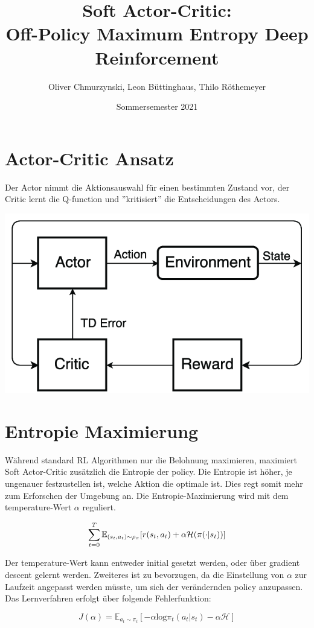 \documentclass[8pt]{article}
\title{\vspace{-3cm}Soft Actor-Critic:\\
{\Large Off-Policy Maximum Entropy Deep Reinforcement}}
\author{{\normalsize Oliver Chmurzynski, Leon Büttinghaus, Thilo Röthemeyer}}
\date{{\normalsize Sommersemester 2021}}
\begin{document}
\maketitle
\thispagestyle{empty}

\begin{multicols}{2}

\section{Actor-Critic Ansatz}
Der Actor nimmt die Aktionsauswahl für einen bestimmten Zustand vor, der Critic lernt die Q-function und ''kritisiert'' die Entscheidungen des Actors.

\begin{center}\includegraphics[width=40ex]{figures/A-regular-actor-critic-model-TD-temporal-difference.png}\end{center}

\section{Entropie Maximierung}
Während standard RL Algorithmen nur die Belohnung maximieren, maximiert Soft Actor-Critic zusätzlich die Entropie der policy. Die Entropie ist höher, je ungenauer festzustellen ist, welche Aktion die optimale ist. Dies regt somit mehr zum Erforschen der Umgebung an. Die Entropie-Maximierung wird mit dem temperature-Wert $\alpha$ reguliert.

\begin{equation}
	\sum_{t=0}^T \mathbb{E}_{(s_t,a_t)\sim\rho_\pi}[{\mathnormal{r}(s_t,a_t)} + \alpha \mathcal{H}(\pi(\cdot|s_t))]
\end{equation}

Der temperature-Wert kann entweder initial gesetzt werden, oder über gradient descent gelernt werden. Zweiteres ist zu bevorzugen, da die Einstellung von $\alpha$ zur Laufzeit angepasst werden müsste, um sich der verändernden policy anzupassen. Das Lernverfahren erfolgt über folgende Fehlerfunktion:

\begin{equation}
J(\alpha)=\mathbb{E}_{a_{t}\sim\pi_{t}}\left[-\alpha \mathrm{log}\pi_{t}(a_{t}|s_{t})-\alpha \mathcal{H}\right]
\end{equation}


\end{multicols}
\end{document}
